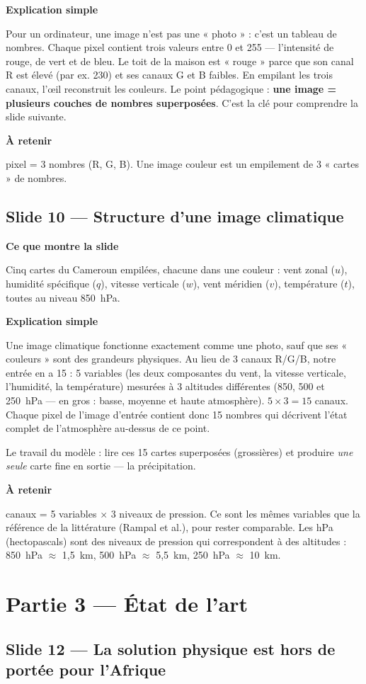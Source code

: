 \documentclass[11pt,a4paper]{article}
\newcommand{\slide}[2]{\subsection*{\textcolor{bleu}{Slide #1 --- #2}}}
\newcommand{\bloc}[1]{\par\medskip\noindent\textcolor{accent}{\textbf{#1}}\par\nopagebreak\smallskip}
\begin{document}
\bloc{Explication simple}
Pour un ordinateur, une image n'est pas une « photo » : c'est un tableau de nombres. Chaque pixel contient trois valeurs entre 0 et 255 --- l'intensité de rouge, de vert et de bleu. Le toit de la maison est « rouge » parce que son canal R est élevé (par ex. 230) et ses canaux G et B faibles. En empilant les trois canaux, l'\oe il reconstruit les couleurs. Le point pédagogique : \textbf{une image = plusieurs couches de nombres superposées}. C'est la clé pour comprendre la slide suivante.

\bloc{À retenir}
1 pixel = 3 nombres (R, G, B). Une image couleur est un empilement de 3 « cartes » de nombres.

\slide{10}{Structure d'une image climatique}

\bloc{Ce que montre la slide}
Cinq cartes du Cameroun empilées, chacune dans une couleur : vent zonal ($u$), humidité spécifique ($q$), vitesse verticale ($w$), vent méridien ($v$), température ($t$), toutes au niveau 850~hPa.

\bloc{Explication simple}
Une image climatique fonctionne exactement comme une photo, sauf que ses « couleurs » sont des grandeurs physiques. Au lieu de 3 canaux R/G/B, notre entrée en a 15 : 5 variables (les deux composantes du vent, la vitesse verticale, l'humidité, la température) mesurées à 3 altitudes différentes (850, 500 et 250~hPa --- en gros : basse, moyenne et haute atmosphère). $5 \times 3 = 15$ canaux. Chaque pixel de l'image d'entrée contient donc 15 nombres qui décrivent l'état complet de l'atmosphère au-dessus de ce point.

Le travail du modèle : lire ces 15 cartes superposées (grossières) et produire \emph{une seule} carte fine en sortie --- la précipitation.

\bloc{À retenir}
15 canaux = 5 variables $\times$ 3 niveaux de pression. Ce sont les mêmes variables que la référence de la littérature (Rampal et al.), pour rester comparable. Les hPa (hectopascals) sont des niveaux de pression qui correspondent à des altitudes : 850~hPa $\approx$ 1,5~km, 500~hPa $\approx$ 5,5~km, 250~hPa $\approx$ 10~km.

\section{Partie 3 --- État de l'art}

\slide{12}{La solution physique est hors de portée pour l'Afrique}
\end{document}

